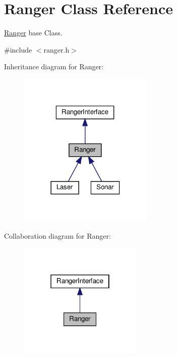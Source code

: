 \hypertarget{classRanger}{}\section{Ranger Class Reference}
\label{classRanger}


\hyperlink{classRanger}{Ranger} base Class.  




{\ttfamily \#include $<$ranger.\+h$>$}



Inheritance diagram for Ranger\+:\nopagebreak
\begin{figure}[H]
\begin{center}
\leavevmode
\includegraphics[width=182pt]{classRanger__inherit__graph}
\end{center}
\end{figure}


Collaboration diagram for Ranger\+:\nopagebreak
\begin{figure}[H]
\begin{center}
\leavevmode
\includegraphics[width=166pt]{classRanger__coll__graph}
\end{center}
\end{figure}
